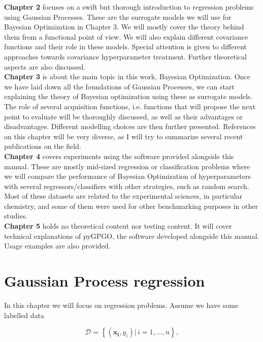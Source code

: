 \documentclass[10pt,a4paper,twoside]{book}
\begin{document}
\textbf{Chapter 2} focuses on a swift but thorough introduction to regression problems using Gaussian Processes. These are the surrogate models we will use for Bayesian Optimization in Chapter 3. We will mostly  cover the theory behind them from a functional point of view. We will also explain different covariance functions and their role in these models. Special attention is given to different approaches towards covariance hyperparameter treatment. Further theoretical aspects are also discussed.\\

\textbf{Chapter 3} is about the main topic in this work, Bayesian Optimization. Once we have laid down all the foundations of Gaussian Processes, we can start explaining the theory of Bayesian optimization using these as surrogate models. The role of several acquisition functions, i.e. functions that will propose the next point to evaluate will be thoroughly discussed, as well as their advantages or disadvantages. Different modelling choices are then further presented. References on this chapter will be very diverse, as I will try to summarize several recent publications on the field.  \\

\textbf{Chapter 4} covers experiments using the software provided alongside this manual. These are mostly mid-sized regression or classification problems where we will compare the performance of Bayesian Optimization of hyperparameters with several regressors/classifiers with other strategies, such as random search. Most of these datasets are related to the experimental sciences, in particular chemistry, and some of them were used for other benchmarking purposes in other studies. \\

\textbf{Chapter 5} holds no theoretical content nor testing content. It will cover technical explanations of pyGPGO, the software developed alongside this manual. Usage examples are also provided. 

\chapter{Gaussian Process regression}

In this chapter we will focus on regression problems. Assume we have some labelled data

\begin{equation}
\mathcal{D} = \left\lbrace \left(\boldsymbol{x_i}, y_i\right) |\, i = 1,\dots,n\right\rbrace,
\end{equation} 
\end{document}
